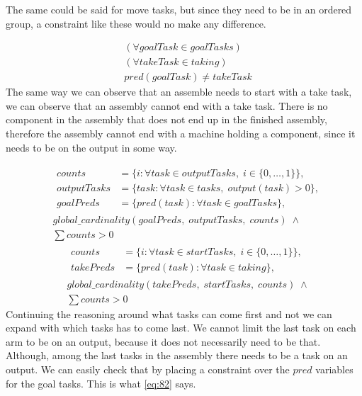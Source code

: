   The same could be said for move tasks, but since they need to be in an ordered group, a constraint like these would no make any difference.
  
  \begin{equation}\label{eq:81}
  \begin{aligned}
  &(\forall goalTask \in goalTasks) \\
  &(\forall takeTask \in taking) \\
  &pred(goalTask) \neq takeTask
  \end{aligned}
  \end{equation}
  The same way we can observe that an assemble needs to start with a take task, we can observe that an assembly cannot end with a take task. There is no component in the assembly that does not end up in the finished assembly, therefore the assembly cannot end with a machine holding a component, since it needs to be on the output in some way. 
  
  \begin{equation}
  \begin{aligned}\label{eq:82}
  &\begin{aligned}
  counts &= \{i : \forall task \in outputTasks, \; i \in \{0 , \ldots , 1\}\}, \\
  outputTasks &= \{task : \forall task \in tasks, \; output(task) > 0\}, \\
  goalPreds &= \{pred(task) : \forall task \in goalTasks\},
  \end{aligned} \\
  &global\_cardinality(goalPreds, \; outputTasks, \; counts) \; \land\\
  &\sum counts > 0
  \end{aligned}
  \end{equation}
   \begin{equation}
   \begin{aligned}\label{eq:83}
   &\begin{aligned}
   counts &= \{i : \forall task \in startTasks, \; i \in \{0 , \ldots , 1\}\}, \\
   takePreds &= \{pred(task) : \forall task \in taking\}, 
   \end{aligned}\\
   &global\_cardinality(takePreds, \; startTasks, \; counts) \; \land\\
   &\sum counts > 0
   \end{aligned}
   \end{equation}
 Continuing the reasoning around what tasks can come first and not we can expand with which tasks has to come last. We cannot limit the last task on each arm to be on an output, because it does not necessarily need to be that. Although, among the last tasks in the assembly there needs to be a task on an output. We can easily check that by placing a constraint over the $pred$ variables for the goal tasks. This is what \ref{eq:82} says.
 
